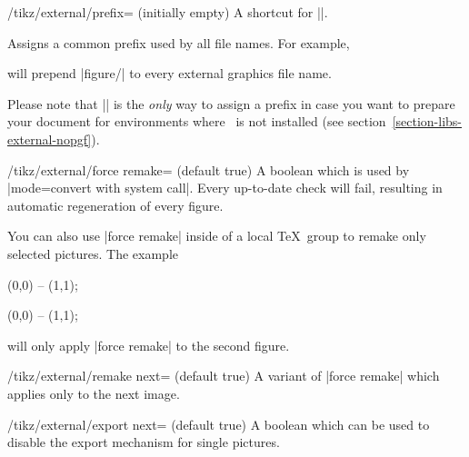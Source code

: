 \begin{key}{/tikz/external/prefix= (initially empty)}
	A shortcut for ||.
\end{key}

\begin{command}{}
	Assigns a common prefix used by all file names. For example,
\begin{codeexample}
\end{codeexample}
	will prepend |figure/| to every external graphics file name.

	Please note that || is the \emph{only} way to assign a prefix in case you want to prepare your document for environments where \pgfname\ is not installed (see section~\ref{section-libs-external-nopgf}).
\end{command}

\begin{key}{/tikz/external/force remake= (default true)}
	A boolean which is used by |mode=convert with system call|. Every up-to-date check will fail, resulting in automatic regeneration of every figure.

\begin{codeexample}
\tikzset{force remake}
\end{codeexample}
	You can also use |force remake| inside of a local \TeX\ group to remake only selected pictures. The example
\begin{codeexample}
\tikz \draw (0,0) -- (1,1);

{
\tikzset{force remake}
}

\tikz \draw (0,0) -- (1,1);
\end{codeexample}
	will only apply |force remake| to the second figure.
\end{key}

\begin{key}{/tikz/external/remake next= (default true)}
	A variant of |force remake| which applies only to the next image.
\end{key}

\begin{key}{/tikz/external/export next= (default true)}
	A boolean which can be used to disable the export mechanism for single pictures.
\end{key}


